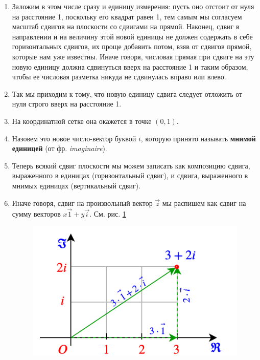 \begin{enumerate}
\item Заложим в этом числе сразу и единицу измерения: пусть оно отстоит от нуля на расстояние 1, поскольку его квадрат равен 1, тем самым мы согласуем масштаб сдвигов на плоскости со сдвигами на прямой. Наконец, сдвиг в направлении и на величину этой новой единицы не должен содержать в себе горизонтальных сдвигов, их проще добавить потом, взяв от сдвигов прямой, которые нам уже известны. Иначе говоря, числовая прямая при сдвиге на эту новую единицу должна сдвинуться вверх на расстояние 1 и таким образом, чтобы ее числовая разметка никуда не сдвинулась вправо или влево.
\item Так мы приходим к тому, что новую единицу сдвига следует отложить от нуля строго вверх на расстояние 1.
\item На координатной сетке она окажется в точке $(0,1)$.
\item Назовем это новое число-вектор буквой $i$,  которую принято называть \textbf{мнимой единицей} (от фр. \textit{imaginaire}).
\item Теперь всякий сдвиг плоскости мы можем записать как композицию сдвига, выраженного в единицах (горизонтальный сдвиг), и сдвига, выраженного в мнимых единицах (вертикальный сдвиг). 
\item Иначе говоря, сдвиг на произвольный вектор $\vec z$ мы распишем как сдвиг на сумму векторов $x\vec 1+y\vec i$. См. рис. \ref{complex}

\begin{figure}[hbt!]
\begin{center}
\includegraphics[scale=0.5]{complex.png}
\end{center}\caption{}\label{complex}
\end{figure}


\end{enumerate}
